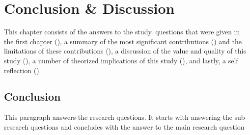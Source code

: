 \chapter{Conclusion \& Discussion}
\label{chap:conclusion}



This chapter consists of the answers to the study.
questions that were given in the first chapter (), 
a summary of the most significant contributions () and the limitations of these contributions (), 
a discussion of the value and quality of this study (),
a number of theorized implications of this study (),
and lastly, a self reflection ().



\section{Conclusion}
\label{sec:conclusion}

This paragraph answers the research questions. 
It starts with answering the sub research questions and concludes with the answer to the main research question

